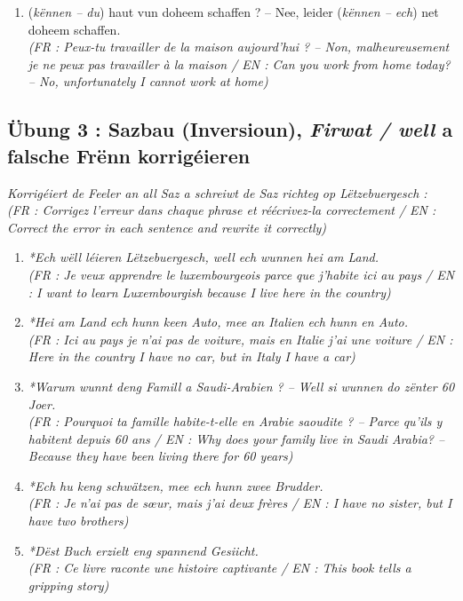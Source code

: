 \begin{enumerate}
    \small\textit{(FR : Combien de langues parles-tu ? -- Je parle trois langues / EN : How many languages do you speak? -- I speak three languages)}
    \item (\textit{kënnen -- du}) \underline{\hspace{2.5cm}} haut vun doheem schaffen ? -- Nee, leider (\textit{kënnen -- ech}) \underline{\hspace{2.5cm}} net doheem schaffen. \\
    \small\textit{(FR : Peux-tu travailler de la maison aujourd'hui ? -- Non, malheureusement je ne peux pas travailler à la maison / EN : Can you work from home today? -- No, unfortunately I cannot work at home)}
\end{enumerate}

\subsection*{Übung 3 : Sazbau (Inversioun), \textit{Firwat / well} a falsche Frënn korrigéieren}
\textit{Korrigéiert de Feeler an all Saz a schreiwt de Saz richteg op Lëtzebuergesch :} \\
\textit{\small(FR : Corrigez l'erreur dans chaque phrase et réécrivez-la correctement / EN : Correct the error in each sentence and rewrite it correctly)}

\begin{enumerate}
    \item \textit{*Ech wëll léieren Lëtzebuergesch, well ech wunnen hei am Land.} \\
    \small\textit{(FR : Je veux apprendre le luxembourgeois parce que j'habite ici au pays / EN : I want to learn Luxembourgish because I live here in the country)}
    \item \textit{*Hei am Land ech hunn keen Auto, mee an Italien ech hunn en Auto.} \\
    \small\textit{(FR : Ici au pays je n'ai pas de voiture, mais en Italie j'ai une voiture / EN : Here in the country I have no car, but in Italy I have a car)}
    \item \textit{*Warum wunnt deng Famill a Saudi-Arabien ? -- Well si wunnen do zënter 60 Joer.} \\
    \small\textit{(FR : Pourquoi ta famille habite-t-elle en Arabie saoudite ? -- Parce qu'ils y habitent depuis 60 ans / EN : Why does your family live in Saudi Arabia? -- Because they have been living there for 60 years)}
    \item \textit{*Ech hu keng schwätzen, mee ech hunn zwee Brudder.} \\
    \small\textit{(FR : Je n'ai pas de sœur, mais j'ai deux frères / EN : I have no sister, but I have two brothers)}
    \item \textit{*Dëst Buch erzielt eng spannend Gesiicht.} \\
    \small\textit{(FR : Ce livre raconte une histoire captivante / EN : This book tells a gripping story)}
\end{enumerate}

